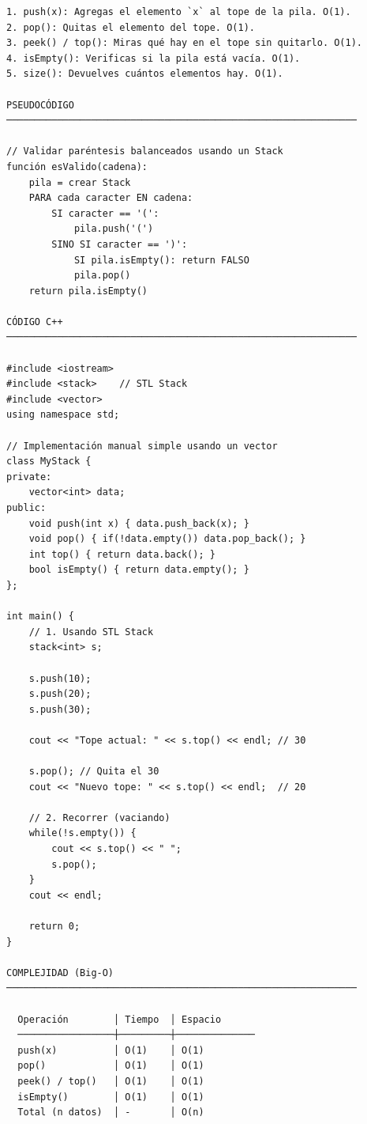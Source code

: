 \begin{lstlisting}
1. push(x): Agregas el elemento `x` al tope de la pila. O(1).
2. pop(): Quitas el elemento del tope. O(1).
3. peek() / top(): Miras qué hay en el tope sin quitarlo. O(1).
4. isEmpty(): Verificas si la pila está vacía. O(1).
5. size(): Devuelves cuántos elementos hay. O(1).

PSEUDOCÓDIGO
──────────────────────────────────────────────────────────────

// Validar paréntesis balanceados usando un Stack
función esValido(cadena):
    pila = crear Stack
    PARA cada caracter EN cadena:
        SI caracter == '(':
            pila.push('(')
        SINO SI caracter == ')':
            SI pila.isEmpty(): return FALSO
            pila.pop()
    return pila.isEmpty()

CÓDIGO C++
──────────────────────────────────────────────────────────────

#include <iostream>
#include <stack>    // STL Stack
#include <vector>
using namespace std;

// Implementación manual simple usando un vector
class MyStack {
private:
    vector<int> data;
public:
    void push(int x) { data.push_back(x); }
    void pop() { if(!data.empty()) data.pop_back(); }
    int top() { return data.back(); }
    bool isEmpty() { return data.empty(); }
};

int main() {
    // 1. Usando STL Stack
    stack<int> s;
    
    s.push(10);
    s.push(20);
    s.push(30);

    cout << "Tope actual: " << s.top() << endl; // 30

    s.pop(); // Quita el 30
    cout << "Nuevo tope: " << s.top() << endl;  // 20

    // 2. Recorrer (vaciando)
    while(!s.empty()) {
        cout << s.top() << " ";
        s.pop();
    }
    cout << endl;

    return 0;
}

COMPLEJIDAD (Big-O)
──────────────────────────────────────────────────────────────

  Operación        │ Tiempo  │ Espacio
  ─────────────────┼─────────┼──────────────
  push(x)          │ O(1)    │ O(1)
  pop()            │ O(1)    │ O(1)
  peek() / top()   │ O(1)    │ O(1)
  isEmpty()        │ O(1)    │ O(1)
  Total (n datos)  │ -       │ O(n)
\end{lstlisting}

